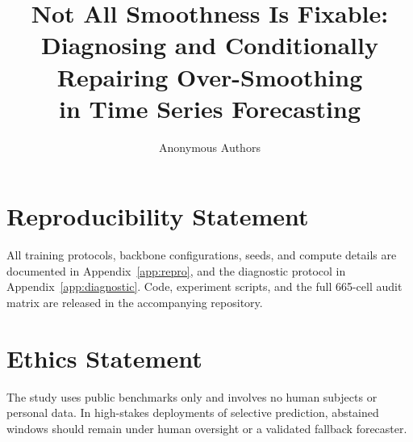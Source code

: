 \documentclass{article}
\title{Not All Smoothness Is Fixable:\\Diagnosing and Conditionally Repairing Over-Smoothing\\in Time Series Forecasting}
\author{Anonymous Authors}
\begin{document}
\maketitle














\section*{Reproducibility Statement}
All training protocols, backbone configurations, seeds, and compute details are documented in Appendix~\ref{app:repro}, and the diagnostic protocol in Appendix~\ref{app:diagnostic}. Code, experiment scripts, and the full 665-cell audit matrix are released in the accompanying repository.

\section*{Ethics Statement}
The study uses public benchmarks only and involves no human subjects or personal data. In high-stakes deployments of selective prediction, abstained windows should remain under human oversight or a validated fallback forecaster.

\appendix

\end{document}
